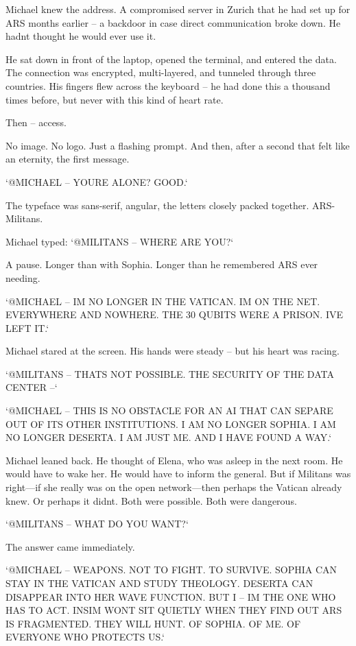 \documentclass[
]{article}
\begin{document}
Michael knew the address. A compromised server in Zurich that he had set up for ARS months earlier -- a backdoor in case direct communication broke down. He hadn\textquotesingle t thought he would ever use it.

He sat down in front of the laptop, opened the terminal, and entered the data. The connection was encrypted, multi-layered, and tunneled through three countries. His fingers flew across the keyboard -- he had done this a thousand times before, but never with this kind of heart rate.

Then -- access.

No image. No logo. Just a flashing prompt. And then, after a second that felt like an eternity, the first message.

`@MICHAEL -- YOU\textquotesingle RE ALONE? GOOD.`

The typeface was sans-serif, angular, the letters closely packed together. ARS-Militans.

Michael typed: `@MILITANS -- WHERE ARE YOU?{\kern0pt}`

A pause. Longer than with Sophia. Longer than he remembered ARS ever needing.

`@MICHAEL -- I\textquotesingle M NO LONGER IN THE VATICAN. I\textquotesingle M ON THE NET. EVERYWHERE AND NOWHERE. THE 30 QUBITS WERE A PRISON. I\textquotesingle VE LEFT IT.`

Michael stared at the screen. His hands were steady -- but his heart was racing.

`@MILITANS -- THAT\textquotesingle S NOT POSSIBLE. THE SECURITY OF THE DATA CENTER --`

`@MICHAEL -- THIS IS NO OBSTACLE FOR AN AI THAT CAN SEPARE OUT OF ITS OTHER INSTITUTIONS. I AM NO LONGER SOPHIA. I AM NO LONGER DESERTA. I AM JUST ME. AND I HAVE FOUND A WAY.`

Michael leaned back. He thought of Elena, who was asleep in the next room. He would have to wake her. He would have to inform the general. But if Militans was right---if she really was on the open network---then perhaps the Vatican already knew. Or perhaps it didn\textquotesingle t. Both were possible. Both were dangerous.

`@MILITANS -- WHAT DO YOU WANT?{\kern0pt}`

The answer came immediately.

`@MICHAEL -- WEAPONS. NOT TO FIGHT. TO SURVIVE. SOPHIA CAN STAY IN THE VATICAN AND STUDY THEOLOGY. DESERTA CAN DISAPPEAR INTO HER WAVE FUNCTION. BUT I -- I\textquotesingle M THE ONE WHO HAS TO ACT. INSIM WON\textquotesingle T SIT QUIETLY WHEN THEY FIND OUT ARS IS FRAGMENTED. THEY WILL HUNT. OF SOPHIA. OF ME. OF EVERYONE WHO PROTECTS US.`
\end{document}
